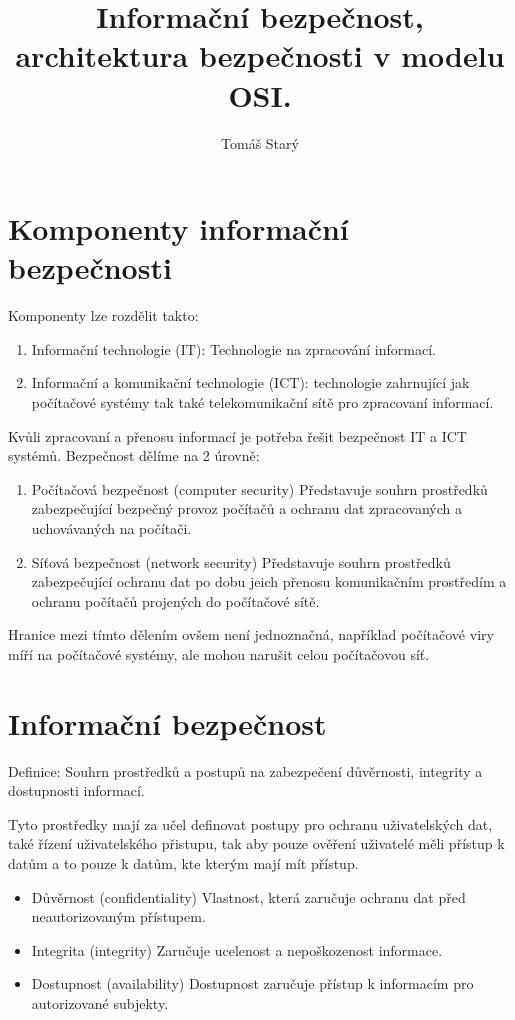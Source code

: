 \documentclass{szzclass}
\title{Informační bezpečnost, architektura bezpečnosti v modelu OSI.}
\author{Tomáš Starý}
\begin{document}
\tableofcontents
\newpage

\section{Komponenty informační bezpečnosti}

Komponenty lze rozdělit takto:
\begin{enumerate}
    \item Informační technologie (IT): Technologie na zpracování informací.
    \item Informační a komunikační technologie (ICT): technologie zahrnující jak počítačové systémy
    tak také telekomunikační sítě pro zpracovaní informací.
\end{enumerate}

Kvůli zpracovaní a přenosu informací je potřeba řešit bezpečnost IT a ICT systémů. Bezpečnost dělíme na 2 úrovně:
\begin{enumerate}
    \item Počítačová bezpečnost (computer security)
          Představuje souhrn prostředků zabezpečující bezpečný provoz počítačů a ochranu dat
          zpracovaných a uchovávaných na počítači.
    \item Síťová bezpečnost (network security)
          Představuje souhrn prostředků zabezpečující ochranu dat po dobu jeich přenosu komunikačním
          prostředím a ochranu počítačů projených do počítačové sítě.
\end{enumerate}

Hranice mezi tímto dělením ovšem není jednoznačná, například počítačové viry míří na počítačové systémy, ale
mohou narušit celou počítačovou síť.

\section{Informační bezpečnost}

Definice: Souhrn prostředků a postupů na zabezpečení důvěrnosti, integrity a dostupnosti informací.

Tyto prostředky mají za učel definovat postupy pro ochranu uživatelských dat, také řízení uživatelského
přistupu, tak aby pouze ověření uživatelé měli přístup k datům a to pouze k datům, kte kterým mají mít přístup.

\begin{itemize}
    \item Důvěrnost (confidentiality)
          Vlastnost, která zaručuje ochranu dat před neautorizovaným přístupem.
    \item Integrita (integrity)
          Zaručuje ucelenost a nepoškozenost informace.
    \item Dostupnost (availability)
          Dostupnost zaručuje přístup k informacím pro autorizované subjekty.
\end{itemize}
\end{document}
